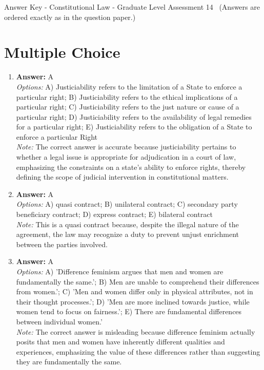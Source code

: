 \documentclass[12pt]{article}
\begin{document}
\begin{center}
Answer Key - Constitutional Law - Graduate Level Assessment 14 \
\small (Answers are ordered exactly as in the question paper.)
\end{center}

\section*{Multiple Choice}
\begin{enumerate}[label=\arabic*.]
\item \textbf{Answer:} A
\\ \textit{Options:} A) Justiciability refers to the limitation of a State to enforce a particular right; B) Justiciability refers to the ethical implications of a particular right; C) Justiciability refers to the just nature or cause of a particular right; D) Justiciability refers to the availability of legal remedies for a particular right; E) Justiciability refers to the obligation of a State to enforce a particular Right
\\ \textit{Note:} The correct answer is accurate because justiciability pertains to whether a legal issue is appropriate for adjudication in a court of law, emphasizing the constraints on a state's ability to enforce rights, thereby defining the scope of judicial intervention in constitutional matters.
\item \textbf{Answer:} A
\\ \textit{Options:} A) quasi contract; B) unilateral contract; C) secondary party beneficiary contract; D) express contract; E) bilateral contract
\\ \textit{Note:} This is a quasi contract because, despite the illegal nature of the agreement, the law may recognize a duty to prevent unjust enrichment between the parties involved.
\item \textbf{Answer:} A
\\ \textit{Options:} A) 'Difference feminism argues that men and women are fundamentally the same.'; B) Men are unable to comprehend their differences from women.'; C) 'Men and women differ only in physical attributes, not in their thought processes.'; D) 'Men are more inclined towards justice, while women tend to focus on fairness.'; E) There are fundamental differences between individual women.'
\\ \textit{Note:} The correct answer is misleading because difference feminism actually posits that men and women have inherently different qualities and experiences, emphasizing the value of these differences rather than suggesting they are fundamentally the same.

\end{enumerate}
\end{document}
